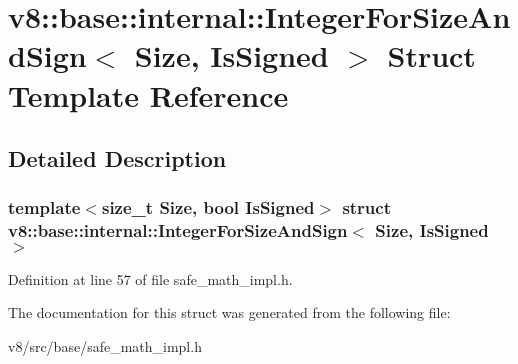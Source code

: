 \hypertarget{structv8_1_1base_1_1internal_1_1IntegerForSizeAndSign}{}\section{v8\+:\+:base\+:\+:internal\+:\+:Integer\+For\+Size\+And\+Sign$<$ Size, Is\+Signed $>$ Struct Template Reference}
\label{structv8_1_1base_1_1internal_1_1IntegerForSizeAndSign}


\subsection{Detailed Description}
\subsubsection*{template$<$size\+\_\+t Size, bool Is\+Signed$>$\newline
struct v8\+::base\+::internal\+::\+Integer\+For\+Size\+And\+Sign$<$ Size, Is\+Signed $>$}



Definition at line 57 of file safe\+\_\+math\+\_\+impl.\+h.



The documentation for this struct was generated from the following file\+:\begin{DoxyCompactItemize}
\item 
v8/src/base/safe\+\_\+math\+\_\+impl.\+h\end{DoxyCompactItemize}
